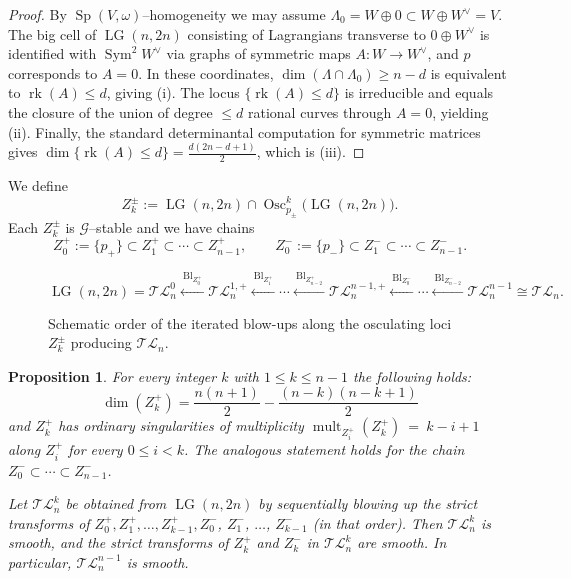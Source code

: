 \documentclass[10pt]{amsart}
\newtheorem{proposition}[theorem]{Proposition}
\theoremstyle{definition}
\newcommand{\LG}{\operatorname{LG}}
\DeclareMathOperator{\Sym}{Sym}
\DeclareMathOperator{\rk}{rk}
\DeclareMathOperator{\mult}{mult}
\DeclareMathOperator{\Osc}{Osc}
\DeclareMathOperator{\Sp}{Sp}
\newcommand{\TL}{\mathcal{TL}}
\theoremstyle{plain} %
\begin{document}
\begin{proof}
By $\Sp(V,\omega)$--homogeneity we may assume $\Lambda_0=W\oplus 0\subset W\oplus W^\vee=V$.
The big cell of $\LG(n,2n)$ consisting of Lagrangians transverse to $0\oplus W^\vee$ is identified with $\Sym^2 W^\vee$ via graphs of symmetric maps $A\colon W\to W^\vee$, and $p$ corresponds to $A=0$.
In these coordinates, $\dim(\Lambda\cap\Lambda_0)\ge n-d$ is equivalent to $\rk(A)\le d$, giving \textup{(i)}. The locus $\{\rk(A)\le d\}$ is irreducible and equals the closure of the union of degree $\le d$ rational curves through $A=0$, yielding \textup{(ii)}.
Finally, the standard determinantal computation for symmetric matrices gives $\dim\{\rk(A)\le d\}= \frac{d(2n-d+1)}{2}$, which is \textup{(iii)}.
\end{proof}

We define
\[
Z_k^\pm := \LG(n,2n)\cap \Osc^k_{p_\pm}\big(\LG(n,2n)\big).
\]
Each $Z_k^\pm$ is $\mathscr G$--stable and we have chains
\[
Z_0^+:=\{p_+\}\subset Z_1^+\subset\cdots\subset Z_{n-1}^+,\qquad Z_0^-:=
\{p_-\}\subset Z_1^-\subset\cdots\subset Z_{n-1}^-.
\]


\begin{figure}[t]
\centering
\[
\LG(n,2n)=\TL_n^{0}
\xleftarrow{\ \mathrm{Bl}_{Z_0^+}\ }\TL_n^{1,+}
\xleftarrow{\ \mathrm{Bl}_{Z_1^+}\ }\cdots
\xleftarrow{\ \mathrm{Bl}_{Z_{n-2}^+}\ }\TL_n^{n-1,+}
\xleftarrow{\ \mathrm{Bl}_{Z_0^-}\ }\cdots
\xleftarrow{\ \mathrm{Bl}_{Z_{n-2}^-}\ }\TL_n^{n-1}\cong \TL_n.
\]
\caption{Schematic order of the iterated blow-ups along the osculating loci $Z_k^\pm$ producing $\TL_n$.}
\label{fig:blowups-TLn}
\end{figure}

\begin{proposition}\label{prop:ordinary-sing}
For every integer $k$ with $1\leq k\leq n-1$ the following holds:
$$
\dim(Z_k^+) = \frac{n(n+1)}{2}-\frac{(n-k)(n-k+1)}{2}
$$ 
and $Z_k^+$ has ordinary singularities of multiplicity $\mult_{Z_i^+}(Z_k^+) \ =\ k-i+1$ along $Z_i^+$ for every $0\leq i<k$. The analogous statement holds for the chain $Z_0^-\subset\cdots\subset Z_{n-1}^-$.

Let $\TL_n^k$ be obtained from $\LG(n,2n)$ by sequentially blowing up the strict transforms of $Z_0^+, Z_1^+, \dots, Z_{k-1}^+, Z_0^-$, $Z_1^-$, $\dots$, $Z_{k-1}^-$ (in that order).
Then $\TL_n^k$ is smooth, and the strict transforms of $Z_k^+$ and $Z_k^-$ in $\TL_n^k$ are smooth. In particular, $\TL_n^{n-1}$ is smooth. %
\end{proposition}
\end{document}
